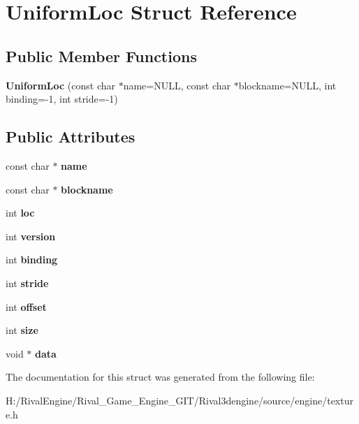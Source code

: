 \hypertarget{struct_uniform_loc}{}\section{Uniform\+Loc Struct Reference}
\label{struct_uniform_loc}
\subsection*{Public Member Functions}
\begin{DoxyCompactItemize}
\item 
\mbox{\label{struct_uniform_loc_a90277eebac4bc72e6560807741bac4bd}} 
{\bfseries Uniform\+Loc} (const char $\ast$name=N\+U\+LL, const char $\ast$blockname=N\+U\+LL, int binding=-\/1, int stride=-\/1)
\end{DoxyCompactItemize}
\subsection*{Public Attributes}
\begin{DoxyCompactItemize}
\item 
\mbox{\label{struct_uniform_loc_acf2005f2260dcf4e66088275ac377719}} 
const char $\ast$ {\bfseries name}
\item 
\mbox{\label{struct_uniform_loc_ae7d103158476e238b0432fab5536f513}} 
const char $\ast$ {\bfseries blockname}
\item 
\mbox{\label{struct_uniform_loc_a83bf8c89cbef0aae338fb7513594cb04}} 
int {\bfseries loc}
\item 
\mbox{\label{struct_uniform_loc_ae3ff788b3e587324bab6c16212e7fcc9}} 
int {\bfseries version}
\item 
\mbox{\label{struct_uniform_loc_af5e19b9e5fbf983165178ebbbac829e5}} 
int {\bfseries binding}
\item 
\mbox{\label{struct_uniform_loc_ac2c3be455fca3e132d4eabaa6f5fdecb}} 
int {\bfseries stride}
\item 
\mbox{\label{struct_uniform_loc_a258cd8850b72205f203afbb1f0ed5315}} 
int {\bfseries offset}
\item 
\mbox{\label{struct_uniform_loc_aaea7c88e8e53a05bf5d226e231eb2160}} 
int {\bfseries size}
\item 
\mbox{\label{struct_uniform_loc_a6ef6cc09e10eaaed650f06cd5ee77b5f}} 
void $\ast$ {\bfseries data}
\end{DoxyCompactItemize}


The documentation for this struct was generated from the following file\+:\begin{DoxyCompactItemize}
\item 
H\+:/\+Rival\+Engine/\+Rival\+\_\+\+Game\+\_\+\+Engine\+\_\+\+G\+I\+T/\+Rival3dengine/source/engine/texture.\+h\end{DoxyCompactItemize}
